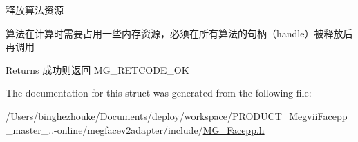释放算法资源

算法在计算时需要占用一些内存资源，必须在所有算法的句柄（handle）被释放后再调用 \begin{DoxyReturn}{Returns}
成功则返回 M\+G\+\_\+\+R\+E\+T\+C\+O\+D\+E\+\_\+\+OK 
\end{DoxyReturn}


The documentation for this struct was generated from the following file\+:\begin{DoxyCompactItemize}
\item 
/\+Users/binghezhouke/\+Documents/deploy/workspace/\+P\+R\+O\+D\+U\+C\+T\+\_\+\+Megvii\+Facepp\+\_\+master\+\_..-\/online/megfacev2adapter/include/\hyperlink{_m_g___facepp_8h}{M\+G\+\_\+\+Facepp.\+h}\end{DoxyCompactItemize}
